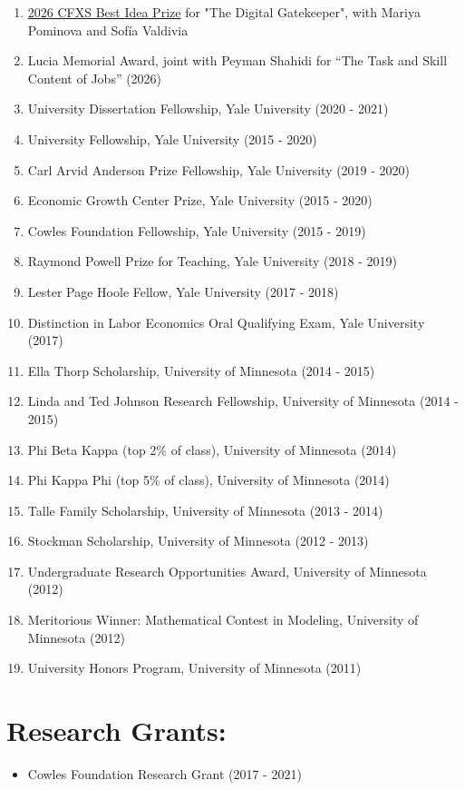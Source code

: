 \documentclass[11pt,letterpaper]{article}
\newcommand{\cvsection}[1]{\Needspace{5\baselineskip}\section*{#1:}}
\begin{document}
\begin{enumerate}[label=\arabic*.,leftmargin=28.8pt,itemsep=2pt,parsep=0pt,topsep=0pt]
\item \href{https://cfxs.org}{2026 CFXS Best Idea Prize} for "The Digital Gatekeeper", with Mariya Pominova and Sofía Valdivia
\item Lucia Memorial Award, joint with Peyman Shahidi for “The Task and Skill Content of Jobs” (2026)
\item University Dissertation Fellowship, Yale University (2020 - 2021)
\item University Fellowship, Yale University (2015 - 2020)
\item Carl Arvid Anderson Prize Fellowship, Yale University (2019 - 2020)
\item Economic Growth Center Prize, Yale University (2015 - 2020)
\item Cowles Foundation Fellowship, Yale University (2015 - 2019)
\item Raymond Powell Prize for Teaching, Yale University (2018 - 2019)
\item Lester Page Hoole Fellow, Yale University (2017 - 2018)
\item Distinction in Labor Economics Oral Qualifying Exam, Yale University (2017)
\item Ella Thorp Scholarship, University of Minnesota (2014 - 2015)
\item Linda and Ted Johnson Research Fellowship, University of Minnesota (2014 - 2015)
\item Phi Beta Kappa (top 2\% of class), University of Minnesota (2014)
\item Phi Kappa Phi (top 5\% of class), University of Minnesota (2014)
\item Talle Family Scholarship, University of Minnesota (2013 - 2014)
\item Stockman Scholarship, University of Minnesota (2012 - 2013)
\item Undergraduate Research Opportunities Award, University of Minnesota (2012)
\item Meritorious Winner: Mathematical Contest in Modeling, University of Minnesota (2012)
\item University Honors Program, University of Minnesota (2011)
\end{enumerate}
\cvsection{Research Grants}
\begin{itemize}
\item Cowles Foundation Research Grant (2017 - 2021)
\end{itemize}
\end{document}
